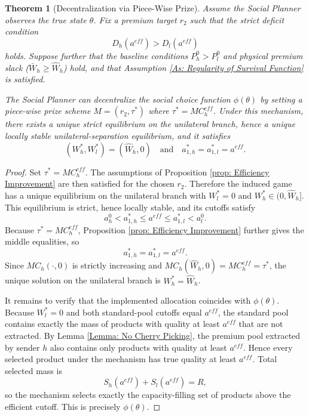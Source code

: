 \documentclass[12pt, a4paper]{article}
\newtheorem{theorem}{Theorem}
\begin{document}
\begin{theorem}[Decentralization via Piece-Wise Prize]
\label{Theorem: Implementation}
    Assume the Social Planner observes the true state $\theta$. Fix a premium target $r_2$ such that the strict deficit condition
    \[
        D_h(a^{eff}) > D_l(a^{eff})
    \]
    holds. Suppose further that the baseline conditions $P_h^0 > P_l^0$ and physical premium slack ($\bar{W}_h \geq \hat{W}_h$) hold, and that Assumption \ref{As: Regularity of Survival Function} is satisfied. 
    
    The Social Planner can decentralize the social choice function $\phi (\theta)$ by setting a piece-wise prize scheme $M = (r_2, \tau^*)$ where $\tau^* = MC_h^{eff}$. Under this mechanism, there exists a unique strict equilibrium on the unilateral branch, hence a unique locally stable unilateral-separation equilibrium, and it satisfies
    \[
        (W_h^*, W_l^*) = (\hat{W}_h, 0)
        \quad \text{and} \quad
        a_{1,h}^* = a_{1,l}^* = a^{eff}.
    \]
\end{theorem}

\begin{proof}
    Set $\tau^* = MC_h^{eff}$. The assumptions of Proposition \ref{prop: Efficiency Improvement} are then satisfied for the chosen $r_2$. Therefore the induced game has a unique equilibrium on the unilateral branch with $W_l^* = 0$ and $W_h^* \in (0,\hat{W}_h]$. This equilibrium is strict, hence locally stable, and its cutoffs satisfy
    \[
        a_h^0 < a_{1,h}^* \le a^{eff} \le a_{1,l}^* < a_l^0.
    \]
    Because $\tau^* = MC_h^{eff}$, Proposition \ref{prop: Efficiency Improvement} further gives the middle equalities, so
    \[
        a_{1,h}^* = a_{1,l}^* = a^{eff}.
    \]
    Since $MC_h(\cdot,0)$ is strictly increasing and $MC_h(\hat{W}_h,0)=MC_h^{eff}=\tau^*$, the unique solution on the unilateral branch is $W_h^*=\hat{W}_h$.

    It remains to verify that the implemented allocation coincides with $\phi(\theta)$. Because $W_l^*=0$ and both standard-pool cutoffs equal $a^{eff}$, the standard pool contains exactly the mass of products with quality at least $a^{eff}$ that are not extracted. By Lemma \ref{Lemma: No Cherry Picking}, the premium pool extracted by sender $h$ also contains only products with quality at least $a^{eff}$. Hence every selected product under the mechanism has true quality at least $a^{eff}$. Total selected mass is
    \[
        S_h(a^{eff}) + S_l(a^{eff}) = R,
    \]
    so the mechanism selects exactly the capacity-filling set of products above the efficient cutoff. This is precisely $\phi(\theta)$.
\end{proof}
\end{document}
